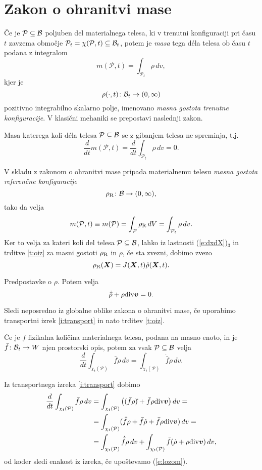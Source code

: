 \section{Zakon o ohranitvi mase}


Če je $\mathcal{P}\subseteq\mathcal B$ poljuben del materialnega telesa, ki v trenutni konfiguraciji pri času $t$
zavzema območje $\mathcal{P}_t=\chi(\mathcal{P},t)\subseteq\mathcal B_t$, potem je \emph{masa} tega déla telesa
ob času $t$ podana z integralom
\[ m(\mathcal{P},t)=\int_{\mathcal{P}_t}\rho\,dv, \]
kjer je
\[ \rho(\cdot,t)\colon\mathcal B_t\to(0,\infty) \]
pozitivno integrabilno skalarno polje, imenovano
\emph{masna gostota trenutne konfiguracije}. V klasični mehaniki se prepostavi naslednji zakon.
\begin{aksiom}
	Masa katerega koli déla telesa $\mathcal{P}\subseteq\mathcal B$ se z gibanjem telesa ne spreminja, t.j.
	\[ \frac{d}{dt}m(\mathcal{P},t)=\frac{d}{dt}\int_{\mathcal{P}_t}\rho\,dv=0. \]
\end{aksiom}
V skladu z zakonom o ohranitvi mase pripada materialnemu telesu \emph{masna gostota referenčne konfiguracije}
\[ \rho_{\mathrm R}\colon\mathcal B\to(0,\infty), \]
tako da velja
\[ m(\mathcal{P},t)\equiv m(\mathcal{P})=\int_{\mathcal{P}}\rho_{\mathrm R}\,dV=\int_{\mathcal{P}_t}\rho\,dv. \]
Ker to velja za kateri koli del telesa $\mathcal{P}\subseteq\mathcal B$, lahko iz lastnosti (\ref{e:dxdX})${}_3$ in trditve \ref{t:oiz}
za masni gostoti $\rho_{\mathrm R}$ in $\rho$, če sta zvezni, dobimo zvezo
\[ \rho_{\mathrm R}(\boldsymbol X)=J(\boldsymbol X,t)\hat{\rho}(\boldsymbol X,t). \]

\begin{izrek}
	\textcolor[rgb]{1,0,0}{Predpostavke o $\rho$.} Potem velja
	\begin{equation} \label{e:lozom} \dot{\bar{\rho}}+\rho\mathrm{div}\boldsymbol v=0. \end{equation}
\end{izrek}
\proof
	Sledi neposredno iz globalne oblike zakona o ohranitvi mase, če uporabimo transportni izrek \ref{i:transport}
	in nato trditev \ref{t:oiz}.
\endproof

\begin{izrek}
	Če je $f$ fizikalna količina materialnega telesa, podana na masno enoto, in je $\bar{f}\colon\mathcal B_t\to W$ njen
	prostorski opis, potem za vsak $\mathcal{P}\subseteq\mathcal B$ velja
	\[ \frac{d}{dt}\int_{\chi_t(\mathcal{P})}\bar{f}\rho\,dv=\int_{\chi_t(\mathcal{P})}\dot{\bar{f}}\rho\,dv. \]
\end{izrek}
\proof
	Iz transportnega izreka \ref{i:transport} dobimo
	\begin{align*}
		\frac{d}{dt}\int_{\chi_t(\mathcal{P})}\bar{f}\rho\,dv
		&= \int_{\chi_t(\mathcal{P})}\big((\bar{f}\rho)\dot{}+\bar{f}\rho\mathrm{div}\boldsymbol v\big)\,dv= \\
		&= \int_{\chi_t(\mathcal{P})}(\dot{\bar{f}}\rho+\bar{f}\dot{\rho}+\bar{f}\rho\mathrm{div}\boldsymbol v)\,dv=\\
		&= \int_{\chi_t(\mathcal{P})}\dot{\bar{f}}\rho\,dv+
		\int_{\chi_t(\mathcal{P})}\bar{f}(\dot{\rho}+\rho\mathrm{div}\boldsymbol v)\,dv,
	\end{align*}
	od koder sledi enakost iz izreka, če upoštevamo (\ref{e:lozom}).
\endproof
